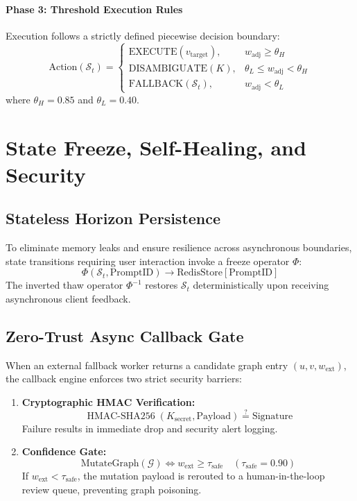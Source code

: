 \documentclass[10pt,twocolumn]{article}
\begin{document}
\paragraph{Phase 3: Threshold Execution Rules}
Execution follows a strictly defined piecewise decision boundary:
\begin{equation}
\text{Action}(\mathcal{S}_t) = 
\begin{cases} 
\text{EXECUTE}(v_{\text{target}}), & w_{\text{adj}} \ge \theta_H \\
\text{DISAMBIGUATE}(K), & \theta_L \le w_{\text{adj}} < \theta_H \\
\text{FALLBACK}(\mathcal{S}_t), & w_{\text{adj}} < \theta_L
\end{cases}
\end{equation}
where $\theta_H = 0.85$ and $\theta_L = 0.40$.

\section{State Freeze, Self-Healing, and Security}

\subsection{Stateless Horizon Persistence}
To eliminate memory leaks and ensure resilience across asynchronous boundaries, state transitions requiring user interaction invoke a freeze operator $\Phi$:
\begin{equation}
\Phi(\mathcal{S}_t, \text{PromptID}) \to \text{RedisStore}[\text{PromptID}]
\end{equation}
The inverted thaw operator $\Phi^{-1}$ restores $\mathcal{S}_t$ deterministically upon receiving asynchronous client feedback.

\subsection{Zero-Trust Async Callback Gate}
When an external fallback worker returns a candidate graph entry $(u, v, w_{\text{ext}})$, the callback engine enforces two strict security barriers:

\begin{enumerate}
    \item \textbf{Cryptographic HMAC Verification:}
    \begin{equation}
    \operatorname{HMAC-SHA256}(K_{\text{secret}}, \text{Payload}) \overset{?}{=} \text{Signature}
    \end{equation}
    Failure results in immediate drop and security alert logging.
    \item \textbf{Confidence Gate:}
    \begin{equation}
    \text{MutateGraph}(\mathcal{G}) \iff w_{\text{ext}} \ge \tau_{\text{safe}} \quad (\tau_{\text{safe}} = 0.90)
    \end{equation}
    If $w_{\text{ext}} < \tau_{\text{safe}}$, the mutation payload is rerouted to a human-in-the-loop review queue, preventing graph poisoning.
\end{enumerate}
\end{document}
